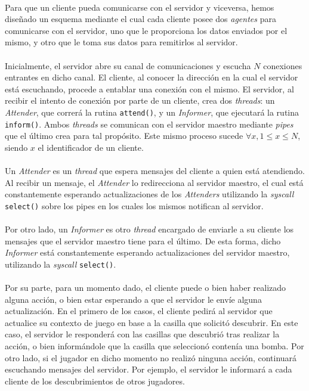 \documentclass[spanish]{article}
\begin{document}
\paragraph{} Para que un cliente pueda comunicarse con el servidor y viceversa, hemos diseñado un esquema mediante el cual cada cliente posee dos \textit{agentes} para comunicarse con el servidor, uno que le proporciona los datos enviados por el mismo, y otro que le toma sus datos para remitirlos al servidor. 
\paragraph{} Inicialmente, el servidor abre su canal de comunicaciones y escucha $N$ conexiones entrantes en dicho canal. El cliente, al conocer la dirección en la cual el servidor está escuchando, procede a entablar una conexión con el mismo. El servidor, al recibir el intento de conexión por parte de un cliente, crea dos \textit{threads}: un \textit{Attender}, que correrá la rutina \verb|attend()|, y un \textit{Informer}, que ejecutará la rutina \verb|inform()|. Ambos \textit{threads} se comunican con el servidor maestro mediante \textit{pipes} que el último crea para tal propósito. Este mismo proceso sucede $\forall x,1 \leq x \leq N$, siendo $x$ el identificador de un cliente.
\paragraph{} Un \textit{Attender} es un \textit{thread} que espera mensajes del cliente a quien está atendiendo. Al recibir un mensaje, el \textit{Attender} lo redirecciona al servidor maestro, el cual está constantemente esperando actualizaciones de los \textit{Attenders} utilizando la \textit{syscall} \verb|select()| sobre los pipes en los cuales los mismos notifican al servidor. 
\paragraph{} Por otro lado, un \textit{Informer} es otro \textit{thread} encargado de enviarle a su cliente los mensajes que el servidor maestro tiene para el último. De esta forma, dicho \textit{Informer} está constantemente esperando actualizaciones del servidor maestro, utilizando la \textit{syscall} \verb|select()|. 
\paragraph{} Por su parte, para un momento dado, el cliente puede o bien haber realizado alguna acción, o bien estar esperando a que el servidor le envíe alguna actualización. En el primero de los casos, el cliente pedirá al servidor que actualice su contexto de juego en base a la casilla que solicitó descubrir. En este caso, el servidor le responderá con las casillas que descubrió tras realizar la acción, o bien informándole que la casilla que seleccionó contenía una bomba. Por otro lado, si el jugador en dicho momento no realizó ninguna acción, continuará escuchando mensajes del servidor. Por ejemplo, el servidor le informará a cada cliente de los descubrimientos de otros jugadores.
\end{document}
